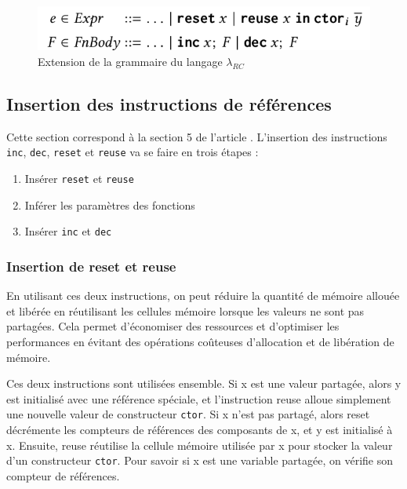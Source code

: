\documentclass{rapportECL}
\begin{document}
\begin{figure}[hbt!]
	\centering
	\includegraphics[scale=0.45]{logos/grammaire_RC.png}
	\caption{Extension de la grammaire du langage $\lambda_{RC}$}
	\label{fig:grammaire RC}
\end{figure}
\FloatBarrier 

\subsection{Insertion des instructions de références} \label{section:insert_inc_dec}

Cette section correspond à la section 5 de l'article \cite{ullrich_counting_2020}.
L'insertion des instructions \verb|inc|, \verb|dec|, \verb|reset| et \verb|reuse| va se faire en trois étapes :
\begin{enumerate}
    \item Insérer \verb|reset| et \verb|reuse|
    \item Inférer les paramètres des fonctions
    \item Insérer \verb|inc| et \verb|dec|
\end{enumerate}

\subsubsection{Insertion de reset et reuse}
En utilisant ces deux instructions, on peut réduire la quantité de mémoire allouée et libérée en réutilisant les cellules mémoire lorsque les valeurs ne sont pas partagées. Cela permet d'économiser des ressources et d'optimiser les performances en évitant des opérations coûteuses d'allocation et de 
libération de mémoire.

Ces deux instructions sont utilisées ensemble. Si x est une valeur partagée, alors y est initialisé avec une référence spéciale,  et l'instruction reuse alloue simplement une nouvelle valeur de constructeur \verb|ctor|. 
Si x n'est pas partagé, alors reset décrémente les compteurs de références des composants de x, et y est initialisé à x. 
Ensuite, reuse réutilise la cellule mémoire utilisée par x pour stocker la valeur d'un constructeur \verb|ctor|. Pour savoir si x est une variable partagée, on vérifie son compteur de références.
\end{document}
